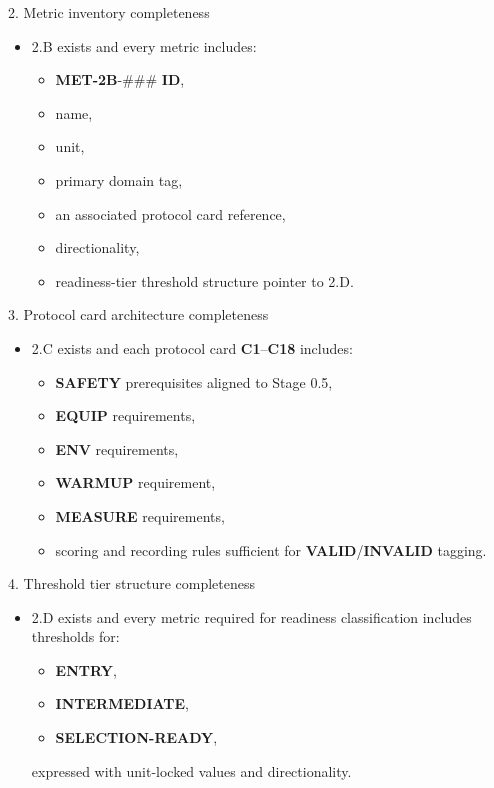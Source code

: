 \documentclass[10pt]{article}
\begin{document}
2. Metric inventory completeness

\begin{itemize}
\item 2.B exists and every metric includes:
  \begin{itemize}
  \item \textbf{MET-2B}-\#\#\# \textbf{ID},
  \item name,
  \item unit,
  \item primary domain tag,
  \item an associated protocol card reference,
  \item directionality,
  \item readiness-tier threshold structure pointer to 2.D.
  \end{itemize}
\end{itemize}

3. Protocol card architecture completeness

\begin{itemize}
\item 2.C exists and each protocol card \textbf{C1}–\textbf{C18} includes:
  \begin{itemize}
  \item \textbf{SAFETY} prerequisites aligned to Stage 0.5,
  \item \textbf{EQUIP} requirements,
  \item \textbf{ENV} requirements,
  \item \textbf{WARMUP} requirement,
  \item \textbf{MEASURE} requirements,
  \item scoring and recording rules sufficient for \textbf{VALID}/\textbf{INVALID} tagging.
  \end{itemize}
\end{itemize}

4. Threshold tier structure completeness

\begin{itemize}
\item 2.D exists and every metric required for readiness classification includes thresholds for:
  \begin{itemize}
  \item \textbf{ENTRY},
  \item \textbf{INTERMEDIATE},
  \item \textbf{SELECTION-READY},
  \end{itemize}
  expressed with unit-locked values and directionality.
\end{itemize}
\end{document}
